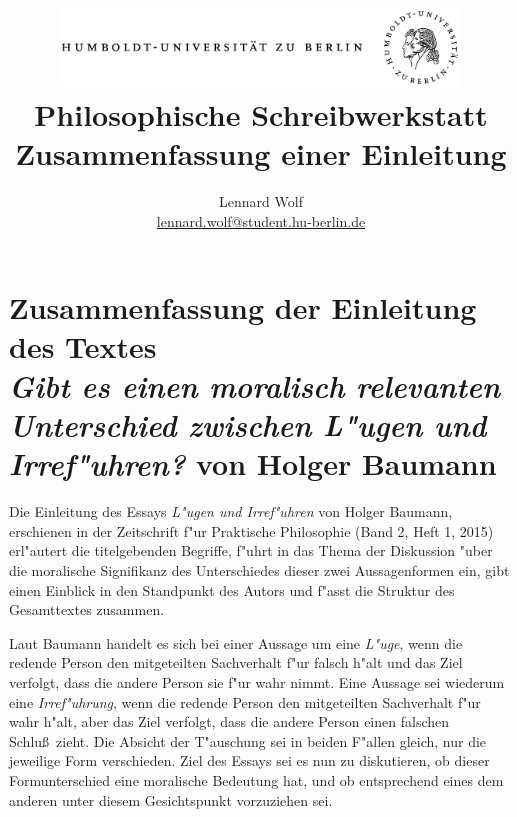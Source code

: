 \documentclass[a4paper]{article}
\begin{document}
\title{
	\includegraphics*[width=0.79\textwidth]{images/hu_logo.png}\\
	\vspace{24pt}
	Philosophische Schreibwerkstatt\\Zusammenfassung einer Einleitung}
\author{Lennard Wolf\\
        \href{mailto:lennard.wolf@student.hu-berlin.de}{lennard.wolf@student.hu-berlin.de}}
\maketitle
\newpage


\section*{Zusammenfassung der Einleitung des Textes \\ \emph{Gibt es einen moralisch relevanten Unterschied zwischen L"ugen und Irref"uhren?} von Holger Baumann}

Die Einleitung des Essays \emph{L"ugen und Irref"uhren} von Holger Baumann, erschienen in der Zeitschrift f"ur Praktische Philosophie (Band 2, Heft 1, 2015) erl"autert die titelgebenden Begriffe, f"uhrt in das Thema der Diskussion "uber die moralische Signifikanz des Unterschiedes dieser zwei Aussagenformen ein, gibt einen Einblick in den Standpunkt des Autors und f"asst die Struktur des Gesamttextes zusammen. 

Laut Baumann handelt es sich bei einer Aussage um eine \emph{L"uge}, wenn die redende Person den mitgeteilten Sachverhalt f"ur falsch h"alt und das Ziel verfolgt, dass die andere Person sie f"ur wahr nimmt. Eine Aussage sei wiederum eine \emph{Irref"uhrung}, wenn die redende Person den mitgeteilten Sachverhalt f"ur wahr h"alt, aber das Ziel verfolgt, dass die andere Person einen falschen Schlu\ss~zieht. Die Absicht der T"auschung sei in beiden F"allen gleich, nur die jeweilige Form verschieden. Ziel des Essays sei es nun zu diskutieren, ob dieser Formunterschied eine moralische Bedeutung hat, und ob entsprechend eines dem anderen unter diesem Gesichtspunkt vorzuziehen sei. 
\end{document}
